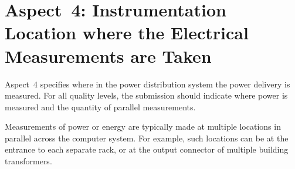 







\section{Aspect~4: Instrumentation Location where the Electrical Measurements are Taken}
\label{sec:A4wEMaT}
Aspect~4 specifies where in the power distribution system the power delivery is measured.
For all quality levels, the submission should indicate where power is measured and the quantity of parallel measurements.

Measurements of power or energy are typically made at multiple locations in parallel across the computer system.
For example, such locations can be at the entrance to each separate rack, or at the output connector of multiple building transformers.

